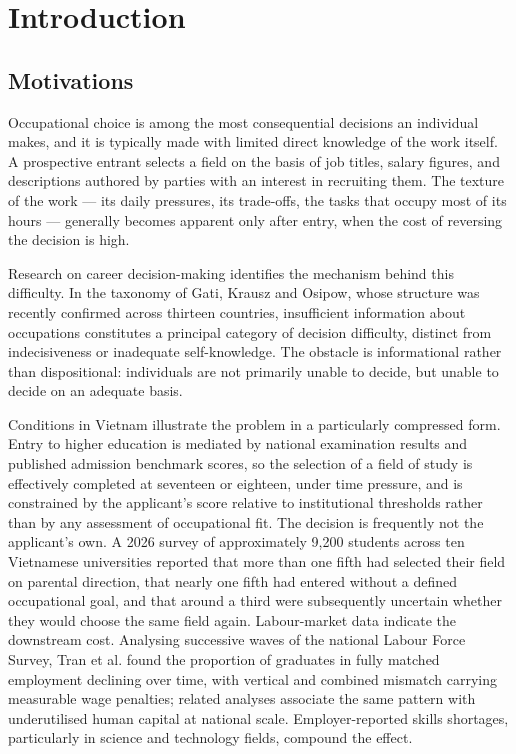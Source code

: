 \newpage
\section{Introduction}

\subsection{Motivations}

Occupational choice is among the most consequential decisions an individual makes, and it is typically made with limited direct knowledge of the work itself. A prospective entrant selects a field on the basis of job titles, salary figures, and descriptions authored by parties with an interest in recruiting them. The texture of the work --- its daily pressures, its trade-offs, the tasks that occupy most of its hours --- generally becomes apparent only after entry, when the cost of reversing the decision is high.

Research on career decision-\allowbreak{}making identifies the mechanism behind this difficulty. In the taxonomy of Gati, Krausz and Osipow\cite{r1}, whose structure was recently confirmed across thirteen countries\cite{r2}, insufficient information about occupations constitutes a principal category of decision difficulty, distinct from indecisiveness or inadequate self-\allowbreak{}knowledge. The obstacle is informational rather than dispositional: individuals are not primarily unable to decide, but unable to decide on an adequate basis.

Conditions in Vietnam illustrate the problem in a particularly compressed form. Entry to higher education is mediated by national examination results and published admission benchmark scores, so the selection of a field of study is effectively completed at seventeen or eighteen, under time pressure, and is constrained by the applicant's score relative to institutional thresholds rather than by any assessment of occupational fit\cite{r3}. The decision is frequently not the applicant's own. A 2026 survey of approximately 9,200 students across ten Vietnamese universities reported that more than one fifth had selected their field on parental direction, that nearly one fifth had entered without a defined occupational goal, and that around a third were subsequently uncertain whether they would choose the same field again\cite{r4}. Labour-\allowbreak{}market data indicate the downstream cost. Analysing successive waves of the national Labour Force Survey, Tran et al.\cite{r5} found the proportion of graduates in fully matched employment declining over time, with vertical and combined mismatch carrying measurable wage penalties; related analyses associate the same pattern with underutilised human capital at national scale. Employer-\allowbreak{}reported skills shortages, particularly in science and technology fields, compound the effect.

